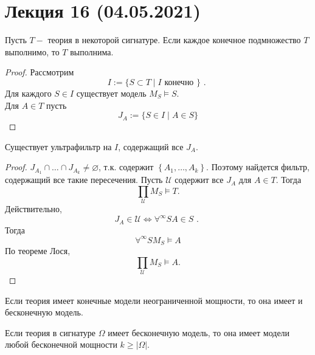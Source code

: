 \section{Лекция 16 (04.05.2021)}

\begin{theo}
Пусть $T-$ теория в некоторой сигнатуре. Если каждое конечное подмножество $T$ выполнимо, то $T$ выполнима.
\end{theo}
\begin{proof}
Рассмотрим
$$
I:=\{S \subset T \mid I \text { конечно }\} \text { . }
$$
Для каждого $S \in I$ существует модель $M_{S} \vDash S .$\\
Для $A \in T$ пусть
$$
J_{A}:=\{S \in I \mid A \in S\}
$$
\end{proof}
\begin{lem}
Существует ультрафильтр на $I$, содержащий все $J_{A} .$
\end{lem}
\begin{proof}
$J_{A_{1}} \cap \ldots \cap J_{A_{k}} \neq \varnothing$, т.к. содержит $\left\{A_{1}, \ldots, A_{k}\right\} .$
Поэтому найдется фильтр, содержащий все такие пересечения.
Пусть $\mathcal{U}$ содержит все $J_{A}$ для $A \in T .$ Тогда
$$
\prod_{\mathcal{U}} M_{S} \vDash T .
$$
Действительно,
$$
J_{A} \in \mathcal{U} \Leftrightarrow \forall^{\infty} S A \in S \text { . }
$$
Тогда
$$
\forall^{\infty} S M_{S} \vDash A
$$
По теореме Лося,
$$
\prod_{\mathcal{U}} M_{S} \vDash A .
$$
\end{proof}

\begin{theo}
Если теория имеет конечные модели неограниченной мощности, то она имеет и бесконечную модель.
\end{theo}
\begin{theo}
Если теория в сигнатуре $\Omega$ имеет бесконечную модель, то она имеет модели любой бесконечной мощности $k \geq|\Omega| .$
\end{theo}